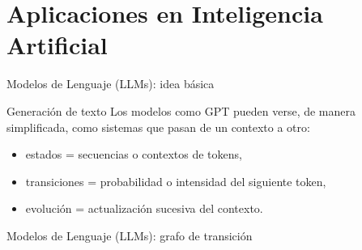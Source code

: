 \documentclass[aspectratio=169]{beamer}
\theoremstyle{plain}
\theoremstyle{definition}
\newcommand{\1}{\mathbf{1}}
\begin{document}
\section{Aplicaciones en Inteligencia Artificial}

\begin{frame}[t]{Modelos de Lenguaje (LLMs): idea básica}
  \begin{block}{Generación de texto}
    Los modelos como GPT pueden verse, de manera simplificada, como sistemas que pasan de un contexto a otro:
    \begin{itemize}
      \item estados = secuencias o contextos de tokens,
      \item transiciones = probabilidad o intensidad del siguiente token,
      \item evolución = actualización sucesiva del contexto.
    \end{itemize}
  \end{block}
\end{frame}

\begin{frame}[t]{Modelos de Lenguaje (LLMs): grafo de transición}
  \begin{center}
  \end{center}
\end{frame}
\end{document}
